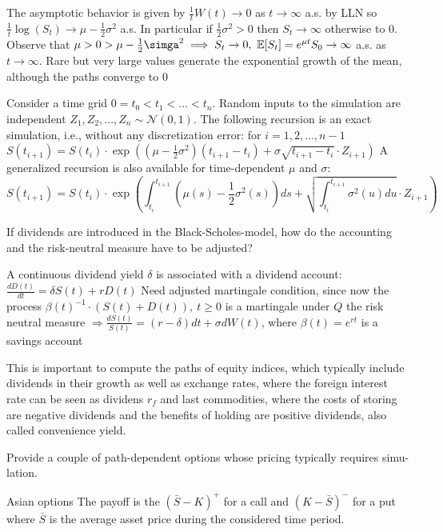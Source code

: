 The asymptotic behavior is given by
\( \frac{1}{t}W(t) \to 0 \) as \( t \to \infty \) a.s. by LLN so 
\( \frac{1}{t}\log(S_t) \to \mu - \frac{1}{2}\sigma^{2} \) a.s.
In particular if \( \frac{1}{2}\sigma^{2} > 0 \) then \( S_t \to \infty \) otherwise to \( 0 \).
Observe that 
\( \mu > 0 > \mu - \frac{1}{2}\simga^2 \implies S_t \to 0,\ \mathbb{E}[S_t] = e^{\mu t}S_0 \to \infty \)
a.s. as \( t \to \infty \).
Rare but very large values generate the exponential growth of the mean, although the paths converge to 0

Consider a time grid \(0 = t_0 < t_1 < ... < t_n\).
Random inputs to the simulation are independent \(Z_1, Z_2, ..., Z_n \sim \mathcal{N}(0, 1)\).
The following recursion is an exact simulation, i.e., without any discretization error:
for \( i = 1, 2, ..., n-1 \)
\( S(t_{i+1}) = S(t_i) \cdot \exp \left( (\mu - \frac{1}{2} \sigma^2) (t_{i+1} - t_i) + \sigma \sqrt{t_{i+1} - t_i} \cdot Z_{i+1} \right)\)
A generalized recursion is also available for time-dependent \(\mu\) and \(\sigma\):
\[ S(t_{i+1}) = S(t_i) \cdot \exp \left( \int_{t_i}^{t_{i+1}} (\mu(s) - \frac{1}{2} \sigma^2(s)) ds + \sqrt{\int_{t_i}^{t_{i+1}} \sigma^2(u) du} \cdot Z_{i+1} \right)\]


If dividends are introduced in the Black-Scholes-model, how do the accounting and
the risk-neutral measure have to be adjusted?

A continuous dividend yield \(\delta\) is associated with a dividend account:
\(\frac{dD(t)}{dt} = \delta S(t) + r D(t)\)
Need adjusted martingale condition, since now the process
\(\beta(t)^{-1} \cdot (S(t) + D(t)),\ t \geq 0 \)
is a martingale under \( Q \) the risk neutral measure
\(\Rightarrow \frac{dS(t)}{S(t)} = (r - \delta) dt + \sigma dW(t) \),
where \( \beta(t) = e^{rt} \) is a savings account

This is important to compute the paths of equity indices, which typically
include dividends in their growth as well as exchange rates, where 
the foreign interest rate can be seen as dividens \( r_f \)
and last commodities, where the costs of storing are negative dividends
and the benefits of holding are positive dividends, also called convenience yield.

Provide a couple of path-dependent options whose pricing typically requires simu-
lation.

Asian options
The payoff is the \( (\bar{S} - K)^{+} \) for a call and \( (K - \bar{S})^{-} \) for a put where \( \bar{S} \) is the average 
asset price during the considered time period.


